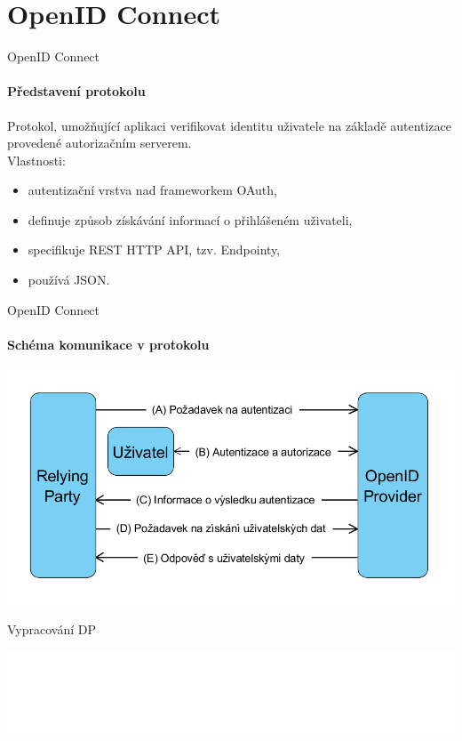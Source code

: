 \documentclass[
]{beamer}
\begin{document}
\section[OpenID Connect]{OpenID Connect}

\begin{frame}{OpenID Connect}
\framesubtitle{Představení protokolu}
Protokol, umožňující aplikaci verifikovat identitu uživatele na základě autentizace provedené autorizačním serverem.
\\
\medskip
Vlastnosti:
\begin{itemize}
  \item autentizační vrstva nad frameworkem OAuth,
  \item definuje způsob získávání informací o přihlášeném uživateli,
  \item specifikuje REST HTTP API, tzv. Endpointy,
  \item používá JSON.
\end{itemize}
\end{frame}

\begin{frame}{OpenID Connect}
\framesubtitle{Schéma komunikace v protokolu}
\includegraphics[width=\textwidth]{pics/diplomkaOIDC}
\end{frame}



\begin{frame}{Vypracování DP}

\end{frame}

\begingroup
{}
\begin{frame}[plain]
\vfill
\centering
\includegraphics[width=\textwidth]{institution}
\vfill
\end{frame}
\endgroup
\end{document}
